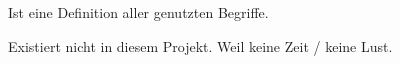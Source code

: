 


Ist eine Definition aller genutzten Begriffe.

Existiert nicht in diesem Projekt.
Weil keine Zeit / keine Lust.
